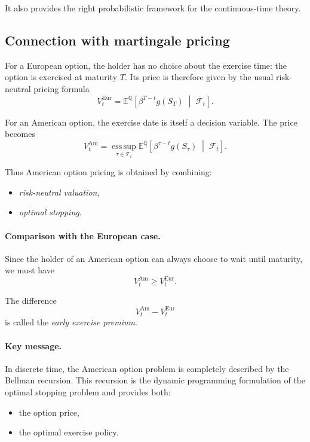 \documentclass[11pt]{article}
\newcommand{\Qbb}{\mathbb{Q}}
\newcommand{\E}{\mathbb{E}}
\theoremstyle{definition}
\theoremstyle{plain}
\begin{document}
It also provides the right probabilistic framework for the
continuous-time theory.

\subsection{Connection with martingale pricing}

For a European option, the holder has no choice about the exercise time:
the option is exercised at maturity \(T\).
Its price is therefore given by the usual risk-neutral pricing formula
\[
V_t^{\mathrm{Eur}}
=
\E^{\Qbb}\!\left[
\beta^{T-t} g(S_T)
\;\middle|\;
\mathcal{F}_t
\right].
\]

For an American option, the exercise date is itself a decision variable.
The price becomes
\[
V_t^{\mathrm{Am}}
=
\operatorname*{ess\,sup}_{\tau\in\mathcal{T}_t}
\E^{\Qbb}\!\left[
\beta^{\tau-t} g(S_\tau)
\;\middle|\;
\mathcal{F}_t
\right].
\]

Thus American option pricing is obtained by combining:
\begin{itemize}[leftmargin=1.4em]
    \item \emph{risk-neutral valuation},
    \item \emph{optimal stopping}.
\end{itemize}

\paragraph{Comparison with the European case.}
Since the holder of an American option can always choose to wait until
maturity, we must have
\[
V_t^{\mathrm{Am}} \ge V_t^{\mathrm{Eur}}.
\]

The difference
\[
V_t^{\mathrm{Am}} - V_t^{\mathrm{Eur}}
\]
is called the \emph{early exercise premium}.

\paragraph{Key message.}
In discrete time, the American option problem is completely described by
the Bellman recursion.
This recursion is the dynamic programming formulation of the optimal
stopping problem and provides both:
\begin{itemize}[leftmargin=1.4em]
    \item the option price,
    \item the optimal exercise policy.
\end{itemize}
\end{document}
